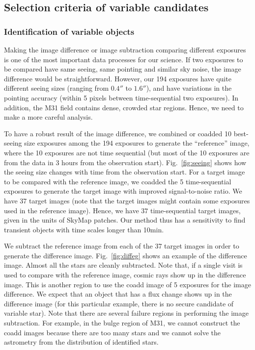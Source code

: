 \documentclass[iop, apj]{emulateapj}
\newcommand{\?}{\stackrel{?}{=}}
\begin{document}
\subsection{Selection criteria of variable candidates}
\label{sec:detecmethod}
\subsubsection{Identification of variable objects}
Making the image difference or image subtraction comparing different exposures is one of the most important data processes for our science. If two exposures to be compared have same seeing, same pointing and similar sky noise, the image difference would be straightforward. However, our 194 exposures have quite different seeing sizes (ranging from $0.4''$ to $1.6''$), and have variations in the pointing accuracy (within 5 pixels between time-sequential two exposures). In addition, the M31 field contains dense, crowded star regions. Hence, we need to make a more careful analysis. 

To have a robust result of the image difference, we combined or coadded 10 best-seeing size exposures among the 194 exposures to generate the ``reference'' image, where the 10 exposures are not time sequential (but most of the 10 exposures are from the data in 3 hours from the observation start). 
Fig.~\ref{fig:seeing} shows how the seeing size changes with time from the observation start. For a target image to be compared with the reference image, we coadded the 5 time-sequential exposures to generate the target image with improved signal-to-noise ratio. We have 37 target images (note that the target images might contain some exposures used in the reference image). Hence, we have $37$ time-sequential target images, given in the units of SkyMap patches. Our method thus has a sensitivity to find transient objects with time scales longer than 10min. 

We subtract the reference image from each of the 37 target images in order to generate the difference image. 
Fig.~\ref{fig:diffeg} shows an example of the difference image. 
Almost all the stars are cleanly subtracted. Note that, if a single visit is used to compare with the reference image, cosmic rays show up in the difference image. This is another region to use the coadd image of 5 exposures for the image difference. We expect that an object that has a flux change shows up in the difference image (for this particular example, there is no secure candidate of variable star). 
Note that there are several failure regions in performing the image subtraction. For example, in the bulge region of M31, we cannot construct the coadd images because there are too many stars and we cannot solve the astrometry from the distribution of identified stars.  
\end{document}

